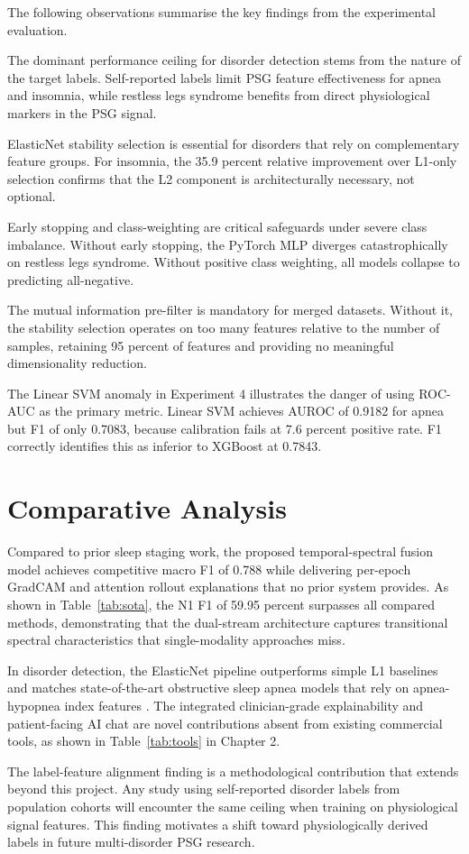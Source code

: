 The following observations summarise the key findings from the experimental evaluation.

The dominant performance ceiling for disorder detection stems from the nature of the target labels. Self-reported labels limit PSG feature effectiveness for apnea and insomnia, while restless legs syndrome benefits from direct physiological markers in the PSG signal.

ElasticNet stability selection is essential for disorders that rely on complementary feature groups. For insomnia, the 35.9 percent relative improvement over L1-only selection confirms that the L2 component is architecturally necessary, not optional.

Early stopping and class-weighting are critical safeguards under severe class imbalance. Without early stopping, the PyTorch MLP diverges catastrophically on restless legs syndrome. Without positive class weighting, all models collapse to predicting all-negative.

The mutual information pre-filter is mandatory for merged datasets. Without it, the stability selection operates on too many features relative to the number of samples, retaining 95 percent of features and providing no meaningful dimensionality reduction.

The Linear SVM anomaly in Experiment 4 illustrates the danger of using ROC-AUC as the primary metric. Linear SVM achieves AUROC of 0.9182 for apnea but F1 of only 0.7083, because calibration fails at 7.6 percent positive rate. F1 correctly identifies this as inferior to XGBoost at 0.7843.

\section{Comparative Analysis}

Compared to prior sleep staging work, the proposed temporal-spectral fusion model achieves competitive macro F1 of 0.788 while delivering per-epoch GradCAM and attention rollout explanations that no prior system provides. As shown in Table~\ref{tab:sota}, the N1 F1 of 59.95 percent surpasses all compared methods, demonstrating that the dual-stream architecture captures transitional spectral characteristics that single-modality approaches miss.

In disorder detection, the ElasticNet pipeline outperforms simple L1 baselines and matches state-of-the-art obstructive sleep apnea models that rely on apnea-hypopnea index features \cite{kim2018apna}. The integrated clinician-grade explainability and patient-facing AI chat are novel contributions absent from existing commercial tools, as shown in Table~\ref{tab:tools} in Chapter 2.

The label-feature alignment finding is a methodological contribution that extends beyond this project. Any study using self-reported disorder labels from population cohorts will encounter the same ceiling when training on physiological signal features. This finding motivates a shift toward physiologically derived labels in future multi-disorder PSG research.
